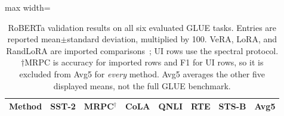 \begin{table}[t]
\centering
\caption{RoBERTa validation results on all six evaluated GLUE tasks. Entries are reported mean$\pm$standard deviation, multiplied by 100. VeRA, LoRA, and RandLoRA are imported comparisons~\citep{albert2025randlora}; UI rows use the spectral protocol. $\dagger$MRPC is accuracy for imported rows and F1 for UI rows, so it is excluded from Avg5 for \emph{every} method. Avg5 averages the other five displayed means, not the full GLUE benchmark.}
\label{tab:glue_results_base_large}
\begin{adjustbox}{max width=\linewidth}
\begin{tabular}{@{}lccccccc@{}}
\toprule
Method & SST-2 & MRPC$^\dagger$ & CoLA & QNLI & RTE & STS-B & Avg5 \\
\midrule
\bottomrule
\end{tabular}
\end{adjustbox}
\end{table}
